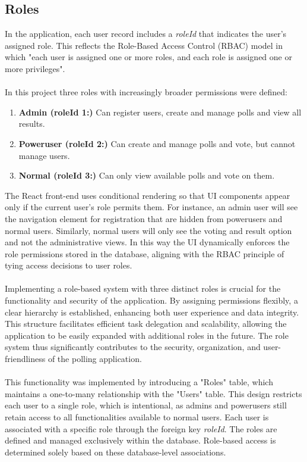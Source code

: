 \documentclass[a4paper,12pt]{report}
\begin{document}
\subsection{Roles}
In the application, each user record includes a \textit{roleId} that indicates the user's assigned role. This reflects the Role-Based Access Control (RBAC) model in which "each user is assigned one or more roles, and each role is assigned one or more privileges". \parencite{rbac}\\\\
In this project three roles with increasingly broader permissions were defined:
\begin{enumerate}
	\item \textbf{Admin (roleId 1:)} Can register users, create and manage polls and view all results.
	\item \textbf{Poweruser (roleId 2:)} Can create and manage polls and vote, but cannot manage users.
	\item \textbf{Normal (roleId 3:)} Can only view available  polls and vote on them.
\end{enumerate}
The React front-end uses conditional rendering so that UI components appear only if the current user's role permits them. For instance, an admin user will see the navigation element for registration that are hidden from powerusers and normal users. Similarly, normal users will only see the voting and result option and not the administrative views. In this way the UI dynamically enforces the role permissions stored in the database, aligning with the RBAC principle of tying access decisions to user roles. \parencite{rbac}\\\\
Implementing a role-based system with three distinct roles is crucial for the functionality and security of the application. By assigning permissions flexibly, a clear hierarchy is established, enhancing both user experience and data integrity. This structure facilitates efficient task delegation and scalability, allowing the application to be easily expanded with additional roles in the future. The role system thus significantly contributes to the security, organization, and user-friendliness of the polling application.\\\\
This functionality was implemented by introducing a "Roles" table, which maintains a one-to-many relationship with the "Users" table. This design restricts each user to a single role, which is intentional, as admins and powerusers still retain access to all functionalities available to normal users. Each user is associated with a specific role through the foreign key \textit{roleId}. The roles are defined and managed exclusively within the database. Role-based access is determined solely based on these database-level associations.\\\\
\end{document}
